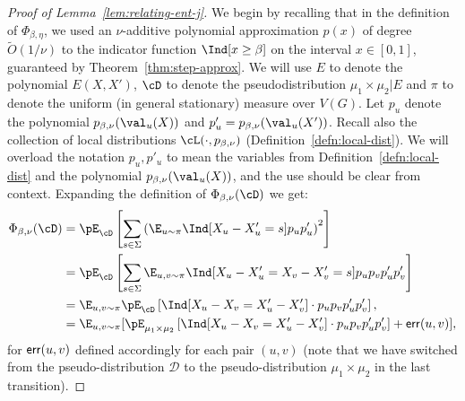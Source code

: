 \begin{proof}[Proof of Lemma~\ref{lem:relating-ent-j}]
We begin by recalling that in the definition of $\Phi_{\beta,\eta}$, we used an $\nu$-additive polynomial approximation $p(x)$ of degree $\widetilde{O}(1/\nu)$ to the indicator function $\Ind[x \ge \beta]$ on the interval $x \in [0,1]$, guaranteed by Theorem~\ref{thm:step-approx}. We will use $E$ to denote the polynomial $E(X,X')$, $\cD$ to denote the pseudodistribution $\mu_1 \times \mu_2 | E$ and $\pi$ to denote the uniform (in general stationary) measure over $V(G)$. Let $p_u$ denote the polynomial $p_{\beta,\nu}(\val_u(X))$ and $p'_u = p_{\beta,\nu}(\val_u(X'))$. Recall also the collection of local distributions $\cL(\cdot, p_{\beta,\nu})$ (Definition~\ref{defn:local-dist}). We will overload the notation $p_u,p'_u$ to mean the variables from Definition~\ref{defn:local-dist} and the polynomial $p_{\beta,\nu}(\val_u(X))$, and the use should be clear from context. Expanding the definition of $\Phi_{\beta,\nu}(\cD)$ we get:
\begin{align}
    \Phi_{\beta,\nu}(\cD)
    &= \pE_{\cD}\left[\sum_{s \in \Sigma} \left(\E_{u \sim \pi} \Ind[X_u - X_u' = s]p_u p'_u\right)^2\right ] \nonumber\\
    &= \pE_{\cD}\left[\sum_{s \in \Sigma} \E_{u,v \sim \pi} \Ind[X_u - X_u' = X_v - X_v' = s]p_up_v p'_u p'_v \right]\nonumber\\
    &= \E_{u,v \sim \pi}\pE_{\cD}\left[ \Ind[X_u - X_v = X'_u- X'_v]\cdot p_u p_vp'_up'_v\right], \nonumber\\
    &= \E_{u,v\sim \pi}[\pE_{\mu_1 \times \mu_2}\left[ \Ind[X_u - X_v = X'_u- X'_v]\cdot p_u p_vp'_up'_v\right] + {\sf err}(u,v)],\label{eq:relating-potential}
\end{align}
for ${\sf err}(u,v)$ defined accordingly for each pair $(u,v)$ (note that we have switched from the pseudo-distribution $\mathcal{D}$ to the pseudo-distribution $\mu_1\times \mu_2$ in the last transition).


\end{proof}
